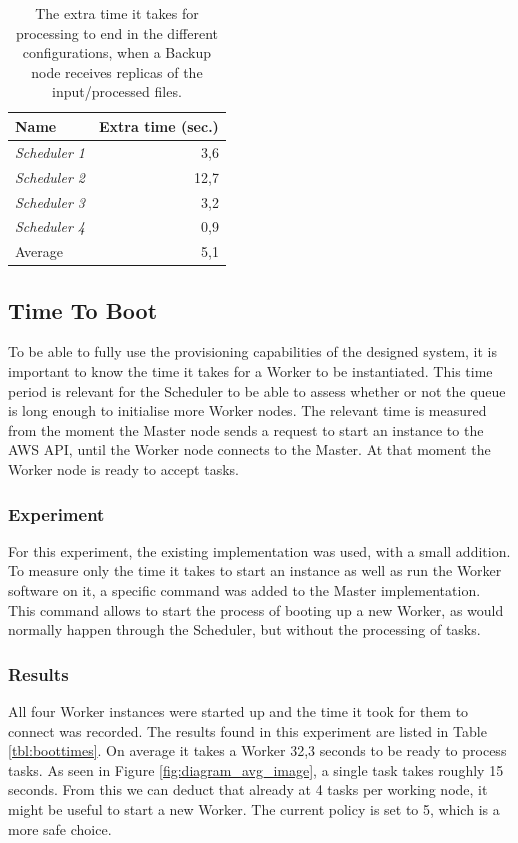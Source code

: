 \documentclass{acm_proc_article-sp}
\begin{document}
\begin{table}
	\centering
	\begin{tabular}{| l | r |}
		\hline
		Name & Extra time (sec.) \\ \hline \hline
		\emph{Scheduler 1} & 3,6 \\ \hline
		\emph{Scheduler 2} & 12,7 \\ \hline
		\emph{Scheduler 3} & 3,2 \\ \hline
		\emph{Scheduler 4} & 0,9 \\ \hline \hline
		Average & 5,1 \\ \hline
	\end{tabular}
	\caption{The extra time it takes for processing to end in the different configurations, when a Backup node receives replicas of the input/processed files.}
	\label{tbl:overhead}
\end{table}

\subsection{Time To Boot}
To be able to fully use the provisioning capabilities of the designed system, it is important to know the time it takes for a Worker to be instantiated.
This time period is relevant for the Scheduler to be able to assess whether or not the queue is long enough to initialise more Worker nodes.
The relevant time is measured from the moment the Master node sends a request to start an instance to the AWS API, until the Worker node connects to the Master.
At that moment the Worker node is ready to accept tasks.

\subsubsection{Experiment}
For this experiment, the existing implementation was used, with a small addition.
To measure only the time it takes to start an instance as well as run the Worker software on it, a specific command was added to the Master implementation.
This command allows to start the process of booting up a new Worker, as would normally happen through the Scheduler, but without the processing of tasks.

\subsubsection{Results}
All four Worker instances were started up and the time it took for them to connect was recorded.
The results found in this experiment are listed in Table \ref{tbl:boottimes}.
On average it takes a Worker 32,3 seconds to be ready to process tasks.
As seen in Figure \ref{fig:diagram_avg_image}, a single task takes roughly 15 seconds. 
From this we can deduct that already at 4 tasks per working node, it might be useful to start a new Worker.
The current policy is set to 5, which is a more safe choice.
\end{document}
